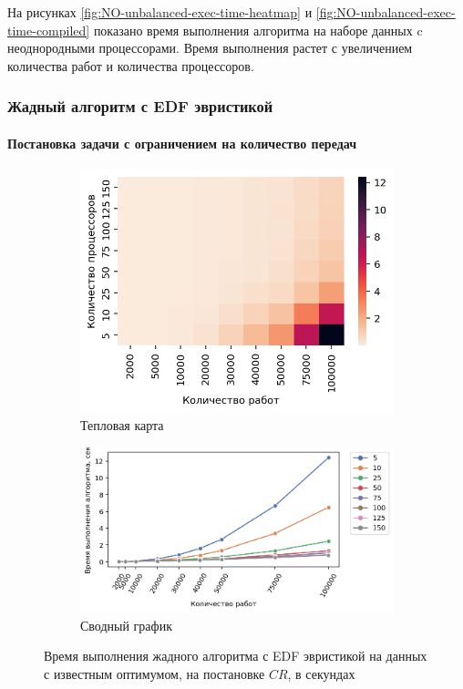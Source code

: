 На рисунках \ref{fig:NO-unbalanced-exec-time-heatmap} и \ref{fig:NO-unbalanced-exec-time-compiled} показано время выполнения алгоритма на наборе данных c неоднородными процессорами. Время выполнения растет с увеличением количества работ и количества процессоров.

\subsubsection{Жадный алгоритм с EDF эвристикой}

\paragraph{Постановка задачи с ограничением на количество передач}

\begin{figure}[!htbp]
    \centering
    \begin{subfigure}{0.49\textwidth}
        \includegraphics[width=\textwidth]{imgs/ideal_1/CR_EDF/et_heatmap.png}
        \caption{Тепловая карта}
        \label{fig:CR-EDF-exec-time-heatmap}
    \end{subfigure}
    \hfill
    \begin{subfigure}{0.49\textwidth}
        \includegraphics[width=\textwidth]{imgs/ideal_1/CR_EDF/tr_graph.png}
        \caption{Сводный график}
        \label{fig:CR-EDF-exec-time-compiled}
    \end{subfigure}
    \caption{Время выполнения жадного алгоритма с EDF эвристикой на данных с известным оптимумом, на постановке $CR$, в секундах}
\end{figure}

